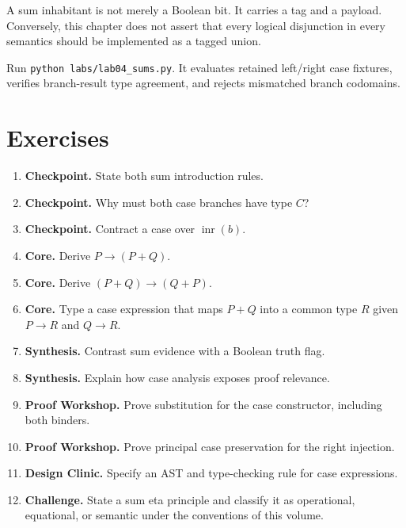 

\begin{warningbox}
A sum inhabitant is not merely a Boolean bit. It carries a tag and a payload. Conversely, this chapter does not assert that every logical disjunction in every semantics should be implemented as a tagged union.
\end{warningbox}

\begin{labbox}
Run \texttt{python labs/lab04_sums.py}. It evaluates retained left/right case fixtures, verifies branch-result type agreement, and rejects mismatched branch codomains.
\end{labbox}

\section*{Exercises}
\begin{enumerate}[label=\textbf{4.\arabic*.}]
\item \textbf{Checkpoint.} State both sum introduction rules.
\item \textbf{Checkpoint.} Why must both case branches have type $C$?
\item \textbf{Checkpoint.} Contract a case over $\operatorname{inr}(b)$.
\item \textbf{Core.} Derive $P\to(P+Q)$.
\item \textbf{Core.} Derive $(P+Q)\to(Q+P)$.
\item \textbf{Core.} Type a case expression that maps $P+Q$ into a common type $R$ given $P\to R$ and $Q\to R$.
\item \textbf{Synthesis.} Contrast sum evidence with a Boolean truth flag.
\item \textbf{Synthesis.} Explain how case analysis exposes proof relevance.
\item \textbf{Proof Workshop.} Prove substitution for the case constructor, including both binders.
\item \textbf{Proof Workshop.} Prove principal case preservation for the right injection.
\item \textbf{Design Clinic.} Specify an AST and type-checking rule for case expressions.
\item \textbf{Challenge.} State a sum eta principle and classify it as operational, equational, or semantic under the conventions of this volume.
\end{enumerate}
